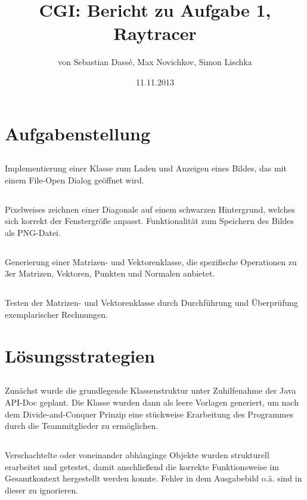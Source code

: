 \documentclass[11pt]{amsart}
\title{CGI: Bericht zu Aufgabe 1, Raytracer}
\author{von Sebastian Dass\'{e}, Max Novichkov, Simon Lischka }
\date{11.11.2013}
\begin{document}
\maketitle

\section{Aufgabenstellung}
\subsection{}
Implementierung einer Klasse zum Laden und Anzeigen eines Bildes, das mit einem File-Open Dialog ge\"offnet wird.

\subsection{}
Pixelweises zeichnen einer Diagonale auf einem schwarzen Hintergrund, welches sich korrekt der Fenstergr\"o\ss{}e anpasst. Funktionalit\"at zum Speichern des Bildes als PNG-Datei.

\subsection{}
Generierung einer Matrizen- und Vektorenklasse, die spezifische Operationen zu 3er Matrizen, Vektoren, Punkten und Normalen anbietet.

\subsection{}
Testen der Matrizen- und Vektorenklasse durch Durchf\"uhrung und \"Uberpr\"ufung exemplarischer Rechnungen.


\section{L\"osungsstrategien}
\subsection{}
Zun\"achst wurde die grundlegende Klassenstruktur unter Zuhilfenahme der Java API-Doc geplant. Die Klasse wurden 
dann als leere Vorlagen generiert, um nach dem Divide-and-Conquer Prinzip eine st\"uckweise Erarbeitung des Programmes
durch die Teammitglieder zu erm\"oglichen.

\subsection{}
Verschachtelte oder voneinander abh\"anginge Objekte wurden strukturell erarbeitet und getestet, damit anschlie\ss{}end 
die korrekte Funktionsweise im Gesamtkontext hergestellt werden konnte. Fehler in dem Ausgabebild o.\"a. sind in dieser
zu ignorieren.
\end{document}
